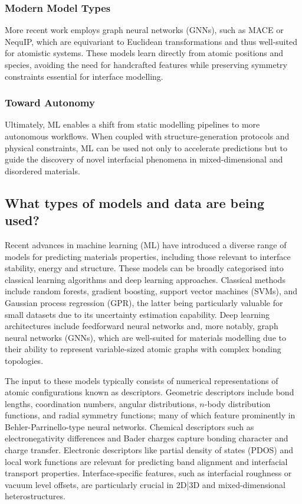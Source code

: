 \subsubsection{Modern Model Types}

More recent work employs graph neural networks (GNNs), such as MACE or NequIP, which are equivariant to Euclidean transformations and thus well-suited for atomistic systems. These models learn directly from atomic positions and species, avoiding the need for handcrafted features while preserving symmetry constraints essential for interface modelling.

\subsubsection{Toward Autonomy}

Ultimately, ML enables a shift from static modelling pipelines to more autonomous workflows. When coupled with structure-generation protocols and physical constraints, ML can be used not only to accelerate predictions but to guide the discovery of novel interfacial phenomena in mixed-dimensional and disordered materials.

\subsection{What types of models and data are being used?}

Recent advances in machine learning (ML) have introduced a diverse range of models for predicting materials properties, including those relevant to interface stability, energy and structure. These models can be broadly categorised into classical learning algorithms and deep learning approaches. Classical methods include random forests, gradient boosting, support vector machines (SVMs), and Gaussian process regression (GPR), the latter being particularly valuable for small datasets due to its uncertainty estimation capability. Deep learning architectures include feedforward neural networks and, more notably, graph neural networks (GNNs), which are well-suited for materials modelling due to their ability to represent variable-sized atomic graphs with complex bonding topologies.

The input to these models typically consists of numerical representations of atomic configurations known as descriptors. Geometric descriptors include bond lengths, coordination numbers, angular distributions, $n$-body distribution functions, and radial symmetry functions; many of which feature prominently in Behler-Parrinello-type neural networks. Chemical descriptors such as electronegativity differences and Bader charges capture bonding character and charge transfer. Electronic descriptors like partial density of states (PDOS) and local work functions are relevant for predicting band alignment and interfacial transport properties. Interface-specific features, such as interfacial roughness or vacuum level offsets, are particularly crucial in 2D|3D and mixed-dimensional heterostructures.

